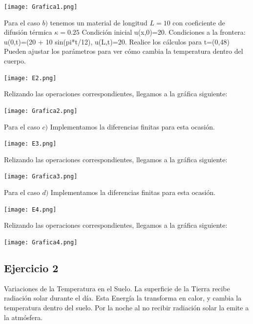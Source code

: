 \documentclass[12pt]{article}
\begin{document}
\begin{center}
    \texttt{[image: Grafica1.png]}
\end{center}


Para el caso $b)$ tenemos un material de longitud $L=10$ con coeficiente de difusión térmica $\kappa=0.25$ Condición inicial u(x,0)=20. Condiciones a la frontera: u(0,t)=(20 + 10 sin(pi*t/12), u(L,t)=20. Realice los cálculos para t=(0,48) Pueden ajustar los parámetros para ver cómo cambia la temperatura dentro del cuerpo.

\begin{center}
    \texttt{[image: E2.png]}
\end{center}

Relizando las operaciones correspondientes, llegamos a la gráfica siguiente:

\begin{center}
    \texttt{[image: Grafica2.png]}
\end{center}


Para el caso $c)$ Implementamos la diferencias finitas para esta ocasión.

\begin{center}
    \texttt{[image: E3.png]}
\end{center}

Relizando las operaciones correspondientes, llegamos a la gráfica siguiente:

\begin{center}
    \texttt{[image: Grafica3.png]}
\end{center}


Para el caso $d)$ Implementamos la diferencias finitas para esta ocasión.

\begin{center}
    \texttt{[image: E4.png]}
\end{center}

Relizando las operaciones correspondientes, llegamos a la gráfica siguiente:

\begin{center}
    \texttt{[image: Grafica4.png]}
\end{center}




\subsection*{Ejercicio 2}

Variaciones de la Temperatura en el Suelo. La superficie de la Tierra recibe radiación solar durante el día. Esta Energía la transforma en calor, y cambia la temperatura dentro del suelo. Por la noche al no recibir radiación solar la emite a la atmósfera. 
\end{document}
